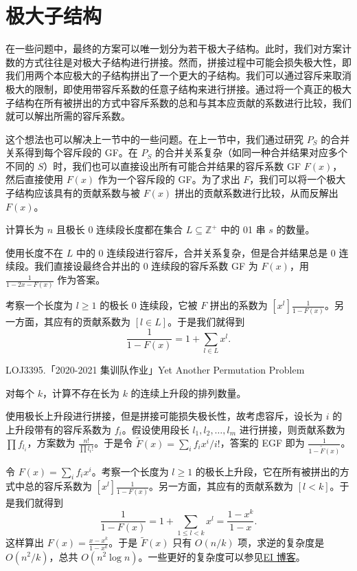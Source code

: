 \section{极大子结构}

在一些问题中，最终的方案可以唯一划分为若干极大子结构。此时，我们对方案计数的方式往往是对极大子结构进行拼接。然而，拼接过程中可能会损失极大性，即我们用两个本应极大的子结构拼出了一个更大的子结构。我们可以通过容斥来取消极大的限制，即使用带容斥系数的任意子结构来进行拼接。通过将一个真正的极大子结构在所有被拼出的方式中容斥系数的总和与其本应贡献的系数进行比较，我们就可以解出所需的容斥系数。

这个想法也可以解决上一节中的一些问题。在上一节中，我们通过研究 $P_S$ 的合并关系得到每个容斥段的 GF。在 $P_S$ 的合并关系复杂（如同一种合并结果对应多个不同的 $S$）时，我们也可以直接设出所有可能合并结果的容斥系数 GF $F(x)$，然后直接使用 $F(x)$ 作为一个容斥段的 GF。为了求出 $F$，我们可以将一个极大子结构应该具有的贡献系数与被 $F(x)$ 拼出的贡献系数进行比较，从而反解出 $F(x)$。

\begin{example}
    计算长为 $n$ 且极长 $0$ 连续段长度都在集合 $L\subseteq \mathbb Z^+$ 中的 01 串 $s$ 的数量。
\end{example}
\begin{solution}
    使用长度不在 $L$ 中的 0 连续段进行容斥，合并关系复杂，但是合并结果总是 0 连续段。我们直接设最终合并出的 0 连续段的容斥系数 GF 为 $F(x)$，用 $\frac{1}{1-2x-F(x)}$ 作为答案。

    考察一个长度为 $l\ge 1$ 的极长 0 连续段，它被 $F$ 拼出的系数为 $[x^l]\frac{1}{1-F(x)}$。另一方面，其应有的贡献系数为 $[l\in L]$。于是我们就得到
    $$
    \frac{1}{1-F(x)}=1+\sum_{l\in L}x^l.
    $$
\end{solution}

\begin{example}
    LOJ3395.「2020-2021 集训队作业」Yet Another Permutation Problem

    对每个 $k$，计算不存在长为 $k$ 的连续上升段的排列数量。
\end{example}
\begin{solution}
    使用极长上升段进行拼接，但是拼接可能损失极长性，故考虑容斥，设长为 $i$ 的上升段带有的容斥系数为 $f_i$。假设使用段长 $l_1,l_2,\ldots,l_m$ 进行拼接，则贡献系数为 $\prod f_{l_i}$，方案数为 $\frac{n!}{\prod l_i!}$。于是令 $\tilde F(x)=\sum_i f_ix^i/i!$，答案的 EGF 即为 $\frac{1}{1-\tilde F(x)}$。
    
    令 $F(x)=\sum_i f_ix^i$。考察一个长度为 $l\ge 1$ 的极长上升段，它在所有被拼出的方式中总的容斥系数为 $[x^l]\frac{1}{1-F(x)}$。另一方面，其应有的贡献系数为 $[l<k]$。于是我们就得到
    $$
    \frac{1}{1-F(x)}=1+\sum_{1\le l<k}x^l=\frac{1-x^{k}}{1-x}.
    $$
    这样算出 $F(x)=\frac{x-x^k}{1-x^k}$。于是 $\tilde F(x)$ 只有 $O(n/k)$ 项，求逆的复杂度是 $O(n^2/k)$，总共 $O(n^2\log n)$。一些更好的复杂度可以参见\href{https://www.luogu.com/article/35h660of}{EI 博客}。
\end{solution}

